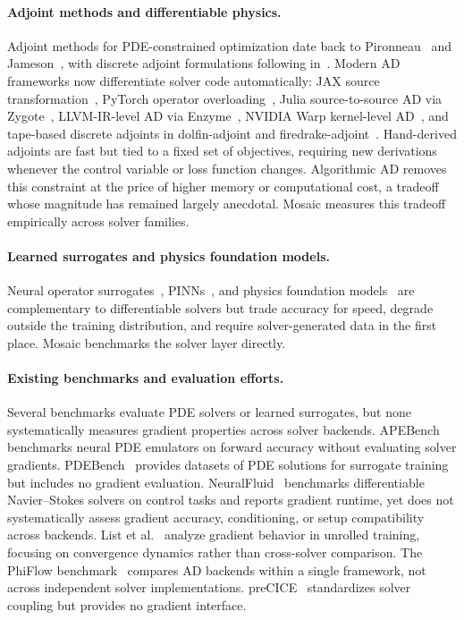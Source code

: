 \documentclass{article}
\begin{document}
\paragraph{Adjoint methods and differentiable physics.}
Adjoint methods for PDE-constrained optimization date back to
Pironneau~\cite{pironneau1974optimum} and
Jameson~\cite{jameson1988aerodynamic}, with discrete adjoint
formulations following in~\cite{giles2000introduction,nadarajah2000studies}.
Modern AD frameworks now differentiate solver code automatically:
JAX source transformation~\cite{bradbury2018jax}, PyTorch operator
overloading~\cite{paszke2019pytorch}, Julia source-to-source AD via
Zygote~\cite{innes2018don}, LLVM-IR-level AD via
Enzyme~\cite{moses2020enzyme}, NVIDIA
Warp kernel-level AD~\cite{macklin2024warp}, and tape-based discrete
adjoints in dolfin-adjoint and
firedrake-adjoint~\cite{farrell2013automated}.
Hand-derived adjoints are fast but tied to a fixed set of objectives,
requiring new derivations whenever the control variable or loss function
changes. Algorithmic AD removes this constraint at the price of higher
memory or computational cost, a tradeoff whose magnitude has remained
largely anecdotal. Mosaic measures this tradeoff empirically across solver families.

\paragraph{Learned surrogates and physics foundation models.}
Neural operator surrogates~\cite{kovachki2023neural,li2021fourier,lu2021learning},
PINNs~\cite{raissi2019physics}, and physics foundation
models~\cite{pathak2022fourcastnet,bodnar2024aurora,price2024gencast,hao2024dpot,herde2024poseidon}
are complementary to differentiable solvers but trade accuracy for speed,
degrade outside the training distribution, and require solver-generated
data in the first place. Mosaic benchmarks the solver layer directly.

\paragraph{Existing benchmarks and evaluation efforts.}
Several benchmarks evaluate PDE solvers or learned surrogates, but none
systematically measures gradient properties across solver backends.
APEBench~\cite{koehler2024apebench} benchmarks neural PDE emulators on
forward accuracy without evaluating solver gradients.
PDEBench~\cite{takamoto2022pdebench} provides datasets of PDE solutions
for surrogate training but includes no gradient evaluation.
NeuralFluid~\cite{fei2024neuralfluid} benchmarks differentiable
Navier--Stokes solvers on control tasks and reports gradient runtime, yet
does not systematically assess gradient accuracy, conditioning, or setup compatibility across backends.
List et al.~\cite{list2024differentiability} analyze gradient behavior in
unrolled training, focusing on convergence dynamics rather than
cross-solver comparison.
The PhiFlow benchmark~\cite{holl2024phiflow} compares AD backends within
a single framework, not across independent solver implementations.
preCICE~\cite{bungartz2016precice} standardizes solver coupling but
provides no gradient interface.
\end{document}
